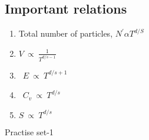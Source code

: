 \subsection{Important relations}
\begin{enumerate}
	\item Total number of particles, $N^{\prime} \alpha T^{d / S}$\\
	\item$V\  \propto\  \frac{1}{T^{d/s-1}}$ \\
	\item\  $E \ \propto \ T^{d / s+1}$\\
	\item\  $C_{v} \ \propto\  T^{d / s}$\\
	\item $S \ \propto\  T^{d / s}$	
\end{enumerate}
\newpage
\begin{abox}
	Practise set-1
\end{abox}
